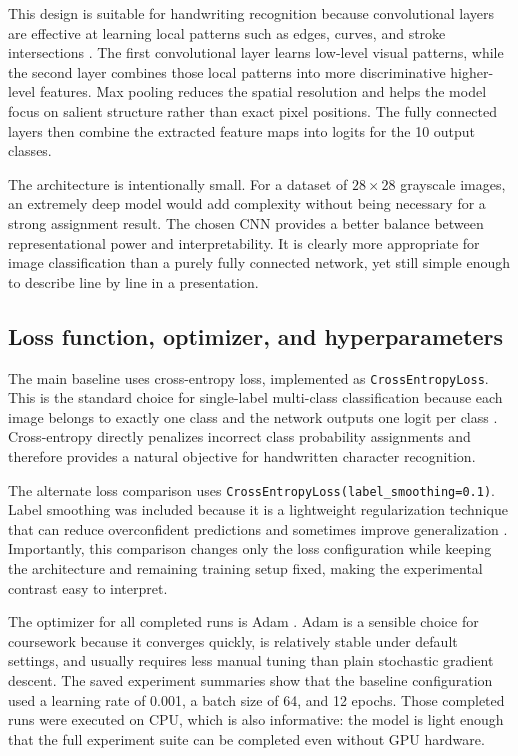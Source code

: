\documentclass[conference]{IEEEtran}
\begin{document}
This design is suitable for handwriting recognition because convolutional layers are effective at learning local patterns such as edges, curves, and stroke intersections \cite{lecun1998}. The first convolutional layer learns low-level visual patterns, while the second layer combines those local patterns into more discriminative higher-level features. Max pooling reduces the spatial resolution and helps the model focus on salient structure rather than exact pixel positions. The fully connected layers then combine the extracted feature maps into logits for the 10 output classes.

The architecture is intentionally small. For a dataset of $28 \times 28$ grayscale images, an extremely deep model would add complexity without being necessary for a strong assignment result. The chosen CNN provides a better balance between representational power and interpretability. It is clearly more appropriate for image classification than a purely fully connected network, yet still simple enough to describe line by line in a presentation.

\subsection{Loss function, optimizer, and hyperparameters}

The main baseline uses cross-entropy loss, implemented as \texttt{CrossEntropyLoss}. This is the standard choice for single-label multi-class classification because each image belongs to exactly one class and the network outputs one logit per class \cite{goodfellow2016}. Cross-entropy directly penalizes incorrect class probability assignments and therefore provides a natural objective for handwritten character recognition.

The alternate loss comparison uses \texttt{CrossEntropyLoss(label\_smoothing=0.1)}. Label smoothing was included because it is a lightweight regularization technique that can reduce overconfident predictions and sometimes improve generalization \cite{szegedy2016}. Importantly, this comparison changes only the loss configuration while keeping the architecture and remaining training setup fixed, making the experimental contrast easy to interpret.

The optimizer for all completed runs is Adam \cite{kingma2015}. Adam is a sensible choice for coursework because it converges quickly, is relatively stable under default settings, and usually requires less manual tuning than plain stochastic gradient descent. The saved experiment summaries show that the baseline configuration used a learning rate of 0.001, a batch size of 64, and 12 epochs. Those completed runs were executed on CPU, which is also informative: the model is light enough that the full experiment suite can be completed even without GPU hardware.
\end{document}
